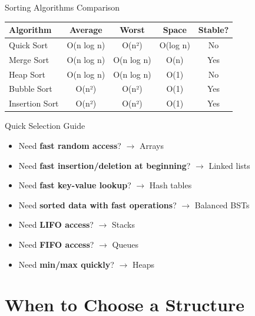 \documentclass[aspectratio=169,xcolor=dvipsnames]{beamer}
\begin{document}
\begin{frame}{Sorting Algorithms Comparison}
  \begin{center}
    \begin{tabular}{l|c|c|c|c}
      \toprule
      \textbf{Algorithm} & \textbf{Average} & \textbf{Worst} & \textbf{Space} & \textbf{Stable?} \\
      \midrule
      Quick Sort & O(n log n) & O(n²) & O(log n) & No \\
      Merge Sort & O(n log n) & O(n log n) & O(n) & Yes \\
      Heap Sort & O(n log n) & O(n log n) & O(1) & No \\
      Bubble Sort & O(n²) & O(n²) & O(1) & Yes \\
      Insertion Sort & O(n²) & O(n²) & O(1) & Yes \\
      \bottomrule
    \end{tabular}
  \end{center}

  \vspace{0.5cm}

  \begin{block}{Quick Selection Guide}
    \begin{itemize}
      \item Need \textbf{fast random access}? $\rightarrow$ Arrays
      \item Need \textbf{fast insertion/deletion at beginning}? $\rightarrow$ Linked lists
      \item Need \textbf{fast key-value lookup}? $\rightarrow$ Hash tables
      \item Need \textbf{sorted data with fast operations}? $\rightarrow$ Balanced BSTs
      \item Need \textbf{LIFO access}? $\rightarrow$ Stacks
      \item Need \textbf{FIFO access}? $\rightarrow$ Queues
      \item Need \textbf{min/max quickly}? $\rightarrow$ Heaps
    \end{itemize}
  \end{block}
\end{frame}

\section{When to Choose a Structure}
\end{document}
